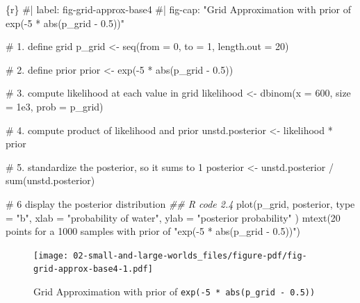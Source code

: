 \documentclass[
  letterpaper,
  DIV=11,
  numbers=noendperiod]{scrreprt}
\newenvironment{Shaded}{\begin{snugshade}}{\end{snugshade}}
\newcommand{\AttributeTok}[1]{\textcolor[rgb]{0.40,0.45,0.13}{#1}}
\newcommand{\CommentTok}[1]{\textcolor[rgb]{0.37,0.37,0.37}{#1}}
\newcommand{\DecValTok}[1]{\textcolor[rgb]{0.68,0.00,0.00}{#1}}
\newcommand{\DocumentationTok}[1]{\textcolor[rgb]{0.37,0.37,0.37}{\textit{#1}}}
\newcommand{\FloatTok}[1]{\textcolor[rgb]{0.68,0.00,0.00}{#1}}
\newcommand{\FunctionTok}[1]{\textcolor[rgb]{0.28,0.35,0.67}{#1}}
\newcommand{\InformationTok}[1]{\textcolor[rgb]{0.37,0.37,0.37}{#1}}
\newcommand{\NormalTok}[1]{\textcolor[rgb]{0.00,0.23,0.31}{#1}}
\newcommand{\OtherTok}[1]{\textcolor[rgb]{0.00,0.23,0.31}{#1}}
\newcommand{\SpecialCharTok}[1]{\textcolor[rgb]{0.37,0.37,0.37}{#1}}
\newcommand{\StringTok}[1]{\textcolor[rgb]{0.13,0.47,0.30}{#1}}
\begin{document}
\begin{Shaded}
\begin{Highlighting}[]
\InformationTok{\textasciigrave{}\textasciigrave{}\textasciigrave{}\{r\}}
\CommentTok{\#| label: fig{-}grid{-}approx{-}base4}
\CommentTok{\#| fig{-}cap: "Grid Approximation with prior of \textasciigrave{}exp({-}5 * abs(p\_grid {-} 0.5))\textasciigrave{}"}

\CommentTok{\# 1. define grid}
\NormalTok{p\_grid }\OtherTok{\textless{}{-}} \FunctionTok{seq}\NormalTok{(}\AttributeTok{from =} \DecValTok{0}\NormalTok{, }\AttributeTok{to =} \DecValTok{1}\NormalTok{, }\AttributeTok{length.out =} \DecValTok{20}\NormalTok{)}

\CommentTok{\# 2. define prior}
\NormalTok{prior }\OtherTok{\textless{}{-}} \FunctionTok{exp}\NormalTok{(}\SpecialCharTok{{-}}\DecValTok{5} \SpecialCharTok{*} \FunctionTok{abs}\NormalTok{(p\_grid }\SpecialCharTok{{-}} \FloatTok{0.5}\NormalTok{))}

\CommentTok{\# 3. compute likelihood at each value in grid}
\NormalTok{likelihood }\OtherTok{\textless{}{-}} \FunctionTok{dbinom}\NormalTok{(}\AttributeTok{x =} \DecValTok{600}\NormalTok{, }\AttributeTok{size =} \FloatTok{1e3}\NormalTok{, }\AttributeTok{prob =}\NormalTok{ p\_grid)}

\CommentTok{\# 4. compute product of likelihood and prior}
\NormalTok{unstd.posterior }\OtherTok{\textless{}{-}}\NormalTok{ likelihood }\SpecialCharTok{*}\NormalTok{ prior}

\CommentTok{\# 5. standardize the posterior, so it sums to 1}
\NormalTok{posterior }\OtherTok{\textless{}{-}}\NormalTok{ unstd.posterior }\SpecialCharTok{/} \FunctionTok{sum}\NormalTok{(unstd.posterior)}

\CommentTok{\# 6 display the posterior distribution }
\DocumentationTok{\#\# R code 2.4}
\FunctionTok{plot}\NormalTok{(p\_grid, posterior,}
  \AttributeTok{type =} \StringTok{"b"}\NormalTok{,}
  \AttributeTok{xlab =} \StringTok{"probability of water"}\NormalTok{, }\AttributeTok{ylab =} \StringTok{"posterior probability"}
\NormalTok{)}
\FunctionTok{mtext}\NormalTok{(}\StringTok{\textquotesingle{}20 points for a 1000 samples with prior of "exp({-}5 * abs(p\_grid {-} 0.5))"\textquotesingle{}}\NormalTok{)}
\InformationTok{\textasciigrave{}\textasciigrave{}\textasciigrave{}}
\end{Highlighting}
\end{Shaded}

\begin{figure}[H]

{\centering \texttt{[image: 02-small-and-large-worlds\_files/figure-pdf/fig-grid-approx-base4-1.pdf]}

}

\caption{\label{fig-grid-approx-base4}Grid Approximation with prior of
\texttt{exp(-5\ *\ abs(p\_grid\ -\ 0.5))}}

\end{figure}
\end{document}
